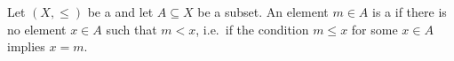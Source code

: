 \begin{definition} \label{definition:maximal_element_in_a_subset_of_a_partially_ordered_set}
Let $(X, \leq)$ be a  and let $A \subseteq X$ be a subset. An element $m \in A$ is a  if there is no element $x \in A$ such that $m < x$, i.e.\ if the condition $m \leq x$ for some $x \in A$ implies $x = m$.
\end{definition}

